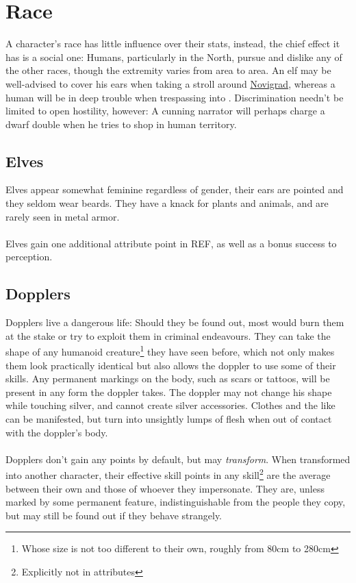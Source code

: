\documentclass[parskip=full,11pt,%
footheight=38pt]{scrreport}
\begin{document}
\section{Race}
A character's race has little influence over their stats, instead, the chief effect it has is a social one: Humans, particularly in the North,
pursue and dislike any of the other races, though the extremity varies from area to area. An elf may be well-advised to cover his ears when
taking a stroll around \hyperref[city:novigrad]{Novigrad}, whereas a human will be in deep trouble when trespassing into .
Discrimination needn't be limited to open hostility, however: A cunning narrator will perhaps charge a dwarf double when he tries to shop in
human territory.

\subsection{Elves}
Elves appear somewhat feminine regardless of gender, their ears are pointed and they seldom
wear beards. They have a knack for plants and animals, and are rarely seen in metal armor.
\\\\
Elves gain one additional attribute point in REF, as well as a bonus success to perception.

\subsection{Dopplers}
Dopplers live a dangerous life: Should they be found out, most would burn them at the stake or try to exploit them in criminal endeavours.
They can take the shape of any humanoid creature\footnote{Whose size is not too different to their own, roughly from 80cm to 280cm} they have seen before, which not only makes them look practically identical but also allows the
doppler to use some of their skills. Any permanent markings on the body, such as scars or tattoos, will be present in any form the doppler takes.
The doppler may not change his shape while touching silver, and cannot create silver accessories. Clothes and the like can be manifested,
but turn into unsightly lumps of flesh when out of contact with the doppler's body.
\\\\
Dopplers don't gain any points by default, but may \textit{transform}. When transformed into another character, their effective skill points in
any skill\footnote{Explicitly not in attributes} are the average between their own and those of whoever they impersonate. They are, unless marked
by some permanent feature, indistinguishable from the people they copy, but may still be found out if they behave strangely.
\end{document}
